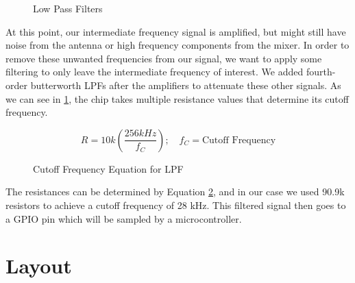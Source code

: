 \begin{figure}[H]
  \centering
\caption{Low Pass Filters}
\label{img:lpf}
\end{figure}

At this point, our intermediate frequency signal is amplified, but might still have
noise from the antenna or high frequency components from the mixer. In order to remove
these unwanted frequencies from our signal, we want to apply some filtering to only leave
the intermediate frequency of interest. We added fourth-order butterworth LPFs after
the amplifiers to attenuate these other signals. As we can see in \ref{img:lpf}, the 
chip takes multiple resistance values that determine its cutoff frequency.

\begin{figure}[H]
  \begin{equation}
    R = 10k \left(\frac{256kHz}{f_C}\right); \quad f_C = \text{Cutoff Frequency}
    \end{equation}
    \caption{Cutoff Frequency Equation for LPF}
    \label{eq:LPF}
  \end{figure}

The resistances can be determined by Equation \ref{eq:LPF}, and in our case
we used 90.9k resistors to achieve a cutoff frequency of 28 kHz. This filtered
signal then goes to a GPIO pin which will be sampled by a microcontroller.

\section{Layout}
\